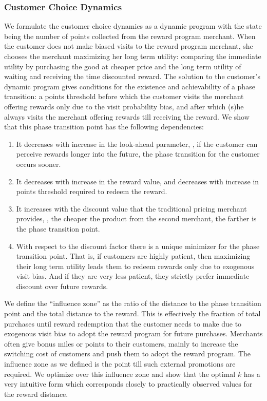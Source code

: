\subsubsection{Customer Choice Dynamics}
We formulate the customer choice dynamics as a dynamic program with the state being the number of points collected from the reward program merchant.
When the customer does not make biased visits to the reward program merchant, she chooses the merchant maximizing her long term utility: comparing the immediate utility by purchasing the good at cheaper price and the long term utility of waiting and receiving the time discounted reward.
The solution to the customer's dynamic program gives conditions for the existence and achievability of a phase transition: a points threshold before which the customer visits the merchant offering rewards only due to the visit probability bias, and after which (s)he always visits the merchant offering rewards till receiving the reward.
We show that this phase transition point has the following dependencies:
\begin{enumerate}
\item It decreases with increase in the look-ahead parameter, \ie, if the customer can perceive rewards longer into the future, the phase transition for the customer occurs sooner.
\item It decreases with increase in the reward value, and decreases with increase in points threshold required to redeem the reward. 
\item It increases with the discount value that the traditional pricing merchant provides, \ie, the cheaper the product from the second merchant, the farther is the phase transition point. 
\item With respect to the discount factor there is a unique minimizer for the phase transition point. That is, if customers are highly patient, then maximizing their long term utility leads them to redeem rewards only due to exogenous visit bias.
And if they are very less patient, they strictly prefer immediate discount over future rewards.
\end{enumerate}

We define the ``influence zone'' as the ratio of the distance to the phase transition  point and the total distance to the reward.
This is effectively the fraction of total purchases until reward redemption that the customer needs to make due to exogenous visit bias to adopt the reward program for future purchases.
Merchants often give bonus miles or points to their customers, mainly to increase the switching cost of customers and push them to adopt the reward program.
The influence zone as we defined is the point till such external promotions are required.
We optimize over this influence zone and show that the optimal $k$ has a very intuitive form which corresponds closely to practically observed values for the reward distance.

